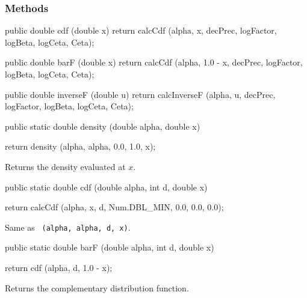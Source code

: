 \subsubsection* {Methods}

\begin{code}\begin{hide}

   public double cdf (double x) {
      return calcCdf (alpha, x, decPrec, logFactor, logBeta, logCeta, Ceta);
   }

   public double barF (double x) {
      return calcCdf (alpha, 1.0 - x, decPrec, logFactor, logBeta,
                      logCeta, Ceta);
   }

   public double inverseF (double u) {
      return calcInverseF (alpha, u, decPrec, logFactor, logBeta,
                           logCeta, Ceta);
   }\end{hide}

   public static double density (double alpha, double x)\begin{hide} {
      return density (alpha, alpha, 0.0, 1.0, x);
   }\end{hide}
\end{code}
\begin{tabb}
  Returns the density evaluated at $x$.
\end{tabb}
\begin{code}

   public static double cdf (double alpha, int d, double x)\begin{hide} {
      return calcCdf (alpha, x, d, Num.DBL_MIN, 0.0, 0.0, 0.0);
   }\end{hide}
\end{code}
\begin{tabb}  Same as
 ~\texttt{(alpha, alpha, d, x)}.
\end{tabb}
\begin{code}

   public static double barF (double alpha, int d, double x)\begin{hide} {
      return cdf (alpha, d, 1.0 - x);
   }\end{hide}
\end{code}
\begin{tabb} Returns the complementary distribution function.
\end{tabb}

